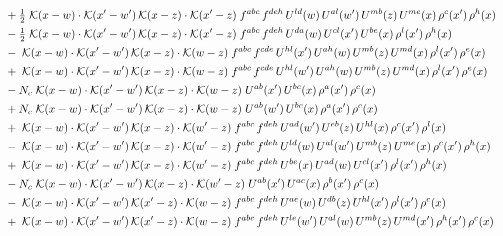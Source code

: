 \documentclass[9pt]{article}
\begin{document}
\begin{align}
&\quad +\tfrac{1}{2}\;\mathcal{K}(x-w)\cdot\mathcal{K}(x'-w')\,\mathcal{K}(x-z)\cdot\mathcal{K}(x'-z)\;f^{abc}\,f^{deh}\,U^{ld}(w)\,U^{al}(w')\,U^{mb}(z)\,U^{me}(x)\,\rho^{c}(x')\,\rho^{h}(x)\notag\\
&\quad -\tfrac{1}{2}\;\mathcal{K}(x-w)\cdot\mathcal{K}(x'-w')\,\mathcal{K}(x-z)\cdot\mathcal{K}(x'-z)\;f^{abc}\,f^{deh}\,U^{da}(w)\,U^{cl}(x')\,U^{be}(x)\,\rho^{l}(x')\,\rho^{h}(x)\notag\\
&\quad -\;\mathcal{K}(x-w)\cdot\mathcal{K}(x'-w')\,\mathcal{K}(x-z)\cdot\mathcal{K}(w-z)\;f^{abc}\,f^{cde}\,U^{hl}(x')\,U^{ah}(w)\,U^{mb}(z)\,U^{md}(x)\,\rho^{l}(x')\,\rho^{e}(x)\notag\\
&\quad +\;\mathcal{K}(x-w)\cdot\mathcal{K}(x'-w')\,\mathcal{K}(x-z)\cdot\mathcal{K}(w-z)\;f^{abc}\,f^{cde}\,U^{hl}(w')\,U^{ah}(w)\,U^{mb}(z)\,U^{md}(x)\,\rho^{l}(x')\,\rho^{e}(x)\notag\\
&\quad -N_c\;\mathcal{K}(x-w)\cdot\mathcal{K}(x'-w')\,\mathcal{K}(x-z)\cdot\mathcal{K}(w-z)\;U^{ab}(x')\,U^{bc}(x)\,\rho^{a}(x')\,\rho^{c}(x)\notag\\
&\quad +N_c\;\mathcal{K}(x-w)\cdot\mathcal{K}(x'-w')\,\mathcal{K}(x-z)\cdot\mathcal{K}(w-z)\;U^{ab}(w')\,U^{bc}(x)\,\rho^{a}(x')\,\rho^{c}(x)\notag\\
&\quad +\;\mathcal{K}(x-w)\cdot\mathcal{K}(x'-w')\,\mathcal{K}(x-z)\cdot\mathcal{K}(w'-z)\;f^{abc}\,f^{deh}\,U^{ad}(w')\,U^{eb}(z)\,U^{hl}(x)\,\rho^{c}(x')\,\rho^{l}(x)\notag\\
&\quad -\;\mathcal{K}(x-w)\cdot\mathcal{K}(x'-w')\,\mathcal{K}(x-z)\cdot\mathcal{K}(w'-z)\;f^{abc}\,f^{deh}\,U^{ld}(w)\,U^{al}(w')\,U^{mb}(z)\,U^{me}(x)\,\rho^{c}(x')\,\rho^{h}(x)\notag\\
&\quad +\;\mathcal{K}(x-w)\cdot\mathcal{K}(x'-w')\,\mathcal{K}(x-z)\cdot\mathcal{K}(w'-z)\;f^{abc}\,f^{deh}\,U^{be}(x)\,U^{ad}(w)\,U^{cl}(x')\,\rho^{l}(x')\,\rho^{h}(x)\notag\\
&\quad -N_c\;\mathcal{K}(x-w)\cdot\mathcal{K}(x'-w')\,\mathcal{K}(x-z)\cdot\mathcal{K}(w'-z)\;U^{ab}(x')\,U^{ac}(x)\,\rho^{b}(x')\,\rho^{c}(x)\notag\\
&\quad -\;\mathcal{K}(x-w)\cdot\mathcal{K}(x'-w')\,\mathcal{K}(x'-z)\cdot\mathcal{K}(w-z)\;f^{abc}\,f^{deh}\,U^{ae}(w)\,U^{db}(z)\,U^{hl}(x')\,\rho^{l}(x')\,\rho^{c}(x)\notag\\
&\quad +\;\mathcal{K}(x-w)\cdot\mathcal{K}(x'-w')\,\mathcal{K}(x'-z)\cdot\mathcal{K}(w-z)\;f^{abc}\,f^{deh}\,U^{le}(w')\,U^{al}(w)\,U^{mb}(z)\,U^{md}(x')\,\rho^{h}(x')\,\rho^{c}(x)\notag\\

\end{align}
\end{document}
